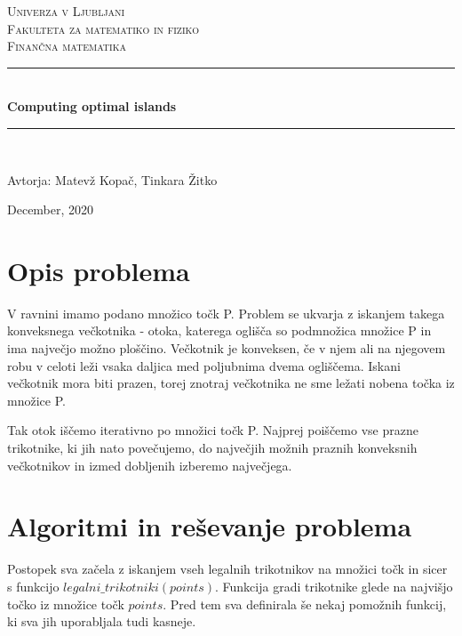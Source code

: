\documentclass[a4, 12pt]{article}
\begin{document}
\begin{titlepage} 
	\newcommand{\HRule}{\rule{\linewidth}{0.5mm}}
	\center	
	\textsc{\LARGE Univerza v Ljubljani}\\[0.5cm]	
	\textsc{\Large Fakulteta za matematiko in fiziko}\\[0.5cm] 	
	\textsc{\large Finančna matematika}\\[2.5cm]
	
	\HRule\\[0.4cm]
	
	{\huge\bfseries Computing optimal islands}\\[0.4cm]
	
	\HRule\\[1.5cm]
		
	\vfill\vfill\vfill
	
	{\large Avtorja: Matevž Kopač, Tinkara Žitko}

	{\large December, 2020}
	
	\vfill

\end{titlepage}

\tableofcontents

\newpage

\section{Opis problema}
V ravnini imamo podano množico točk P. Problem se ukvarja z iskanjem takega konveksnega večkotnika - otoka, katerega oglišča so podmnožica množice P in ima največjo možno ploščino. Večkotnik je konveksen, če v njem ali na njegovem robu v celoti leži vsaka daljica med poljubnima dvema ogliščema. Iskani večkotnik mora biti prazen, torej znotraj večkotnika ne sme ležati nobena točka iz množice P. 

Tak otok iščemo iterativno po množici točk P. Najprej poiščemo vse prazne trikotnike, ki jih nato povečujemo, do največjih možnih praznih konveksnih večkotnikov in izmed dobljenih izberemo največjega.

\section{Algoritmi in reševanje problema}

Postopek sva začela z iskanjem vseh legalnih trikotnikov na množici točk in sicer s funkcijo $legalni\_trikotniki(points)$. 
Funkcija gradi trikotnike glede na najvišjo točko iz množice točk $points$.  Pred tem sva definirala še nekaj pomožnih funkcij, ki sva jih uporabljala tudi kasneje.
\end{document}
